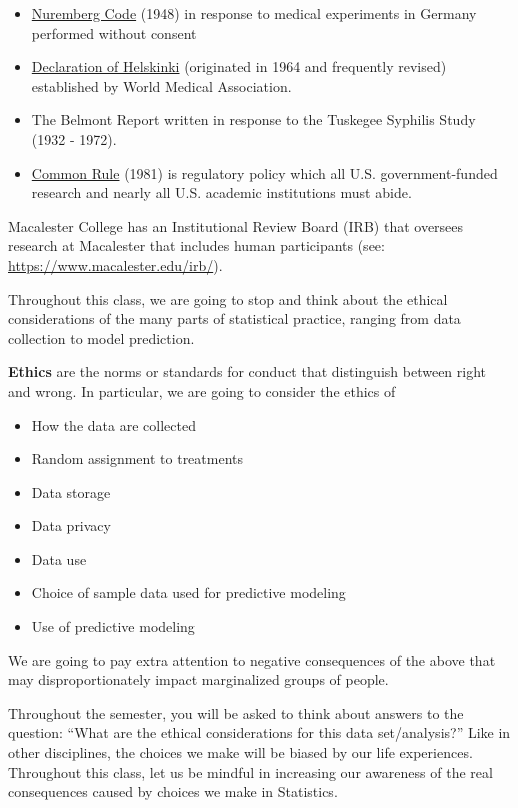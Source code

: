 \documentclass[]{book}
\providecommand{\tightlist}{%
  \setlength{\itemsep}{0pt}\setlength{\parskip}{0pt}}
\begin{document}
\begin{itemize}
\tightlist
\item
  \href{https://www.nejm.org/doi/full/10.1056/NEJM199711133372006}{Nuremberg Code} (1948) in response to medical experiments in Germany performed without consent
\item
  \href{https://www.wma.net/what-we-do/medical-ethics/}{Declaration of Helskinki} (originated in 1964 and frequently revised) established by World Medical Association.
\item
  The Belmont Report written in response to the Tuskegee Syphilis Study (1932 - 1972).
\item
  \href{https://www.hhs.gov/ohrp/regulations-and-policy/regulations/common-rule/index.html}{Common Rule} (1981) is regulatory policy which all U.S. government-funded research and nearly all U.S. academic institutions must abide.
\end{itemize}

Macalester College has an Institutional Review Board (IRB) that oversees research at Macalester that includes human participants (see: \url{https://www.macalester.edu/irb/}).

Throughout this class, we are going to stop and think about the ethical considerations of the many parts of statistical practice, ranging from data collection to model prediction.

\textbf{Ethics} are the norms or standards for conduct that distinguish between right and wrong. In particular, we are going to consider the ethics of

\begin{itemize}
\tightlist
\item
  How the data are collected
\item
  Random assignment to treatments
\item
  Data storage
\item
  Data privacy
\item
  Data use
\item
  Choice of sample data used for predictive modeling
\item
  Use of predictive modeling
\end{itemize}

We are going to pay extra attention to negative consequences of the above that may disproportionately impact marginalized groups of people.

Throughout the semester, you will be asked to think about answers to the question: ``What are the ethical considerations for this data set/analysis?'' Like in other disciplines, the choices we make will be biased by our life experiences. Throughout this class, let us be mindful in increasing our awareness of the real consequences caused by choices we make in Statistics.
\end{document}
